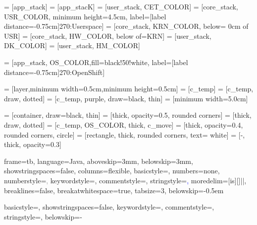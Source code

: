   = [app_stack]
 = [app_stacK]
 = [user_stack, CET_COLOR]
 = [core_stack, USR_COLOR, minimum height=4.5cm, label={[label distance=-0.75cm]270:\color{white}Userspace}]
 = [core_stack, KRN_COLOR, below= 0cm of USR]
  = [core_stack, HW_COLOR, below of=KRN]
  = [user_stack, DK_COLOR]
  = [user_stack, HM_COLOR]

 = [app_stack, OS_COLOR,fill=black!50!white, label={[label distance=-0.75cm]270:OpenShift}]

 = [layer,minimum width=0.5cm,minimum height=0.5cm]
 = [c_temp]
 = [c_temp, draw, dotted]
 = [c_temp, purple, draw=black, thin]
     = [minimum width=5.0cm]

    = [container, draw=black, thin]
  = [thick, opacity=0.5, rounded corners]
   = [thick, draw, dotted] %
= [c_temp, OS_COLOR, thick, c_move]
  = [thick, opacity=0.4, rounded corners, circle]
 = [rectangle, thick, rounded corners, text= white]
 = [-, thick, opacity=0.3]


 {
  frame=tb,
  language=Java,
  aboveskip=3mm,
  belowskip=3mm,
  showstringspaces=false,
  columns=flexible,
  basicstyle={\large\ttfamily},
  numbers=none,
  numberstyle=\textcolor{gray},
  keywordstyle=\textcolor{red!75},
  commentstyle=\textcolor{dkgreen},
  stringstyle=\textcolor{blue},
  moredelim=[is][\textcolor{black!75}]{|}{|},
  breaklines=false,
  breakatwhitespace=true,
  tabsize=3,
  belowskip=-0.5em %
}

 {
  basicstyle=\ttfamily,
  showstringspaces=false,
  keywordstyle=\textcolor{keyword},
  commentstyle=\textcolor{comment},
  stringstyle=\textcolor{string},
  belowskip=-\baselineskip
}

